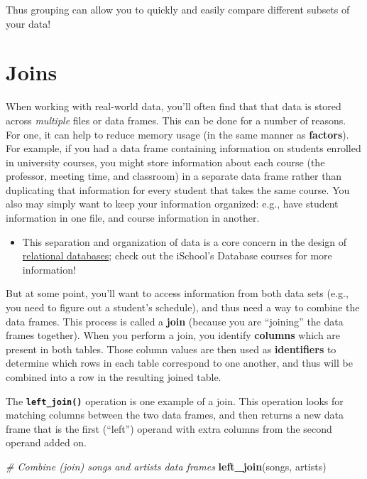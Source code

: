\documentclass[]{book}
\newenvironment{Shaded}{\begin{snugshade}}{\end{snugshade}}
\newcommand{\KeywordTok}[1]{\textcolor[rgb]{0.13,0.29,0.53}{\textbf{#1}}}
\newcommand{\CommentTok}[1]{\textcolor[rgb]{0.56,0.35,0.01}{\textit{#1}}}
\newcommand{\NormalTok}[1]{#1}
\providecommand{\tightlist}{%
  \setlength{\itemsep}{0pt}\setlength{\parskip}{0pt}}
\theoremstyle{definition}
\theoremstyle{definition}
\theoremstyle{remark}
\begin{document}
Thus grouping can allow you to quickly and easily compare different
subsets of your data!

\section{Joins}\label{joins}

When working with real-world data, you'll often find that that data is
stored across \emph{multiple} files or data frames. This can be done for
a number of reasons. For one, it can help to reduce memory usage (in the
same manner as \textbf{factors}). For example, if you had a data frame
containing information on students enrolled in university courses, you
might store information about each course (the professor, meeting time,
and classroom) in a separate data frame rather than duplicating that
information for every student that takes the same course. You also may
simply want to keep your information organized: e.g., have student
information in one file, and course information in another.

\begin{itemize}
\tightlist
\item
  This separation and organization of data is a core concern in the
  design of
  \href{https://en.wikipedia.org/wiki/Relational_database}{relational
  databases}; check out the iSchool's Database courses for more
  information!
\end{itemize}

But at some point, you'll want to access information from both data sets
(e.g., you need to figure out a student's schedule), and thus need a way
to combine the data frames. This process is called a \textbf{join}
(because you are ``joining'' the data frames together). When you perform
a join, you identify \textbf{columns} which are present in both tables.
Those column values are then used as \textbf{identifiers} to determine
which rows in each table correspond to one another, and thus will be
combined into a row in the resulting joined table.

The \textbf{\texttt{left\_join()}} operation is one example of a join.
This operation looks for matching columns between the two data frames,
and then returns a new data frame that is the first (``left'') operand
with extra columns from the second operand added on.

\begin{Shaded}
\begin{Highlighting}[]
\CommentTok{# Combine (join) songs and artists data frames}
\KeywordTok{left_join}\NormalTok{(songs, artists)}
\end{Highlighting}
\end{Shaded}
\end{document}
